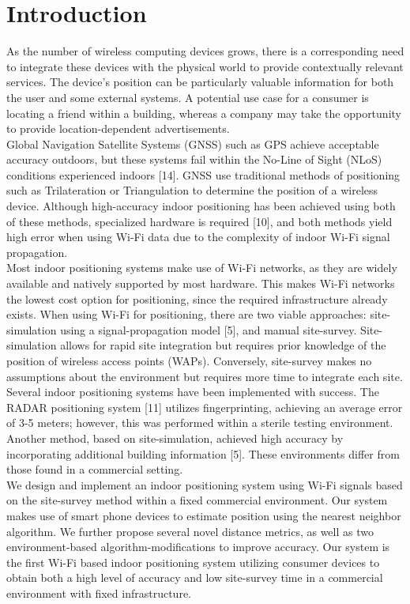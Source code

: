 \documentclass[conference]{IEEEtran}
\begin{document}
\section{Introduction}
As the number of wireless computing devices grows, there is a corresponding need to integrate these devices with the physical world to provide contextually relevant services. The device's position can be particularly valuable information for both the user and some external systems. A potential use case for a consumer is locating a friend within a building, whereas a company may take the opportunity to provide location-dependent advertisements.\\
\indent Global Navigation Satellite Systems (GNSS) such as GPS achieve acceptable accuracy outdoors, but these systems fail within the No-Line of Sight (NLoS) conditions experienced indoors [14]. GNSS use traditional methods of positioning such as Trilateration or Triangulation to determine the position of a wireless device. Although high-accuracy indoor positioning has been achieved using both of these methods, specialized hardware is required [10], and both methods yield high error when using Wi-Fi data due to the complexity of indoor Wi-Fi signal propagation. \\
\indent Most indoor positioning systems make use of Wi-Fi networks, as they are widely available and natively supported by most hardware. This makes Wi-Fi networks the lowest cost option for positioning, since the required infrastructure already exists. When using Wi-Fi for positioning, there are two viable approaches: site-simulation using a signal-propagation model [5], and manual site-survey. Site-simulation allows for rapid site integration but requires prior knowledge of the position of wireless access points (WAPs). Conversely, site-survey makes no assumptions about the environment but requires more time to integrate each site. \\
\indent Several indoor positioning systems have been implemented with success. The RADAR positioning system [11] utilizes fingerprinting, achieving an average error of 3-5 meters; however, this was performed within a sterile testing environment. Another method, based on site-simulation, achieved high accuracy by incorporating additional building information [5]. These environments differ from those found in a commercial setting.\\
\indent We design and implement an indoor positioning system using Wi-Fi signals based on the site-survey method within a fixed commercial environment. Our system makes use of smart phone devices to estimate position using the nearest neighbor algorithm. We further propose several novel distance metrics, as well as two environment-based algorithm-modifications to improve accuracy. Our system is the first Wi-Fi based indoor positioning system utilizing consumer devices to obtain both a high level of accuracy and low site-survey time in a commercial environment with fixed infrastructure.\\
\end{document}
